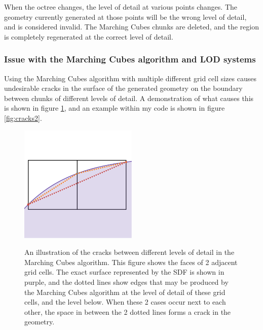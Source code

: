\documentclass{article}
\begin{document}
When the octree changes, the level of detail at various points changes. The geometry currently generated at those points will be the wrong level of detail, and is considered invalid. The Marching Cubes chunks are deleted, and the region is completely regenerated at the correct level of detail.

\subsubsection{Issue with the Marching Cubes algorithm and LOD systems}
\label{section:cracks}
Using the Marching Cubes algorithm with multiple different grid cell sizes causes undesirable cracks in the surface of the generated geometry on the boundary between chunks of different levels of detail. A demonstration of what causes this is shown in figure \ref{fig:cracks_demo}, and an example within my code is shown in figure \ref{fig:cracks2}.

\begin{figure}
  \caption{An illustration of the cracks between different levels of detail in the Marching Cubes algorithm. This figure shows the faces of 2 adjacent grid cells. The exact surface represented by the SDF is shown in purple, and the dotted lines show edges that may be produced by the Marching Cubes algorithm at the level of detail of these grid cells, and the level below. When these 2 cases occur next to each other, the space in between the 2 dotted lines forms a crack in the geometry.}
  \includegraphics[width=0.5\textwidth]{cracks_demo.png}
  \label{fig:cracks_demo}
\end{figure}
\end{document}
